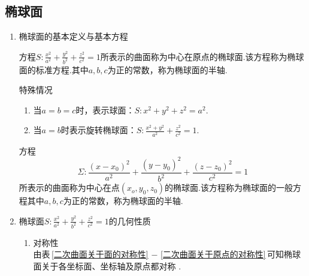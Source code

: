\subsection{椭球面}\label{椭球面}
\sja
\begin{enumerate}
	\setlength{\itemindent}{0em}
	\setlength{\topsep}{0.01em}
	\setlength{\itemsep}{0.01em}
	\item 椭球面的基本定义与基本方程
\jg

\enbelowdefination[椭球面]
\hspace*{1em} 方程$\displaystyle S:\frac{x^2}{a^2}+\frac{y^2}{b^2}+\frac{z^2}{c^2}=1$所表示的曲面称为中心在原点的{\color{dy}椭球面}.该方程称为{\color{dy}椭球面的标准方程}.其中$a,b,c$为正的常数，称为椭球面的{\color{dy}半轴}.
\par {\color{dy}特殊情况}
\sja
\begin{enumerate}
	\setlength{\itemindent}{1em}
	\setlength{\topsep}{0.01em}
	\setlength{\itemsep}{0.01em}
	\item 当$a=b=c$时，表示球面：$S:x^2+y^2+z^2=a^2$.
	\item 当$a=b$时表示{\color{dy}旋转椭球面}\label{旋转椭球面}：$ \displaystyle S:\frac{x^2+y^2}{a^2}+\frac{z^2}{c^2}=1$.
\end{enumerate}

\enbelowtheorem[椭球面的一般方程]
\hspace*{1em} 方程
\begin{equation}
\Sigma : \frac{(x-x_0)^2}{a^2}+\frac{(y-y_0)^2}{b^2}+\frac{(z-z_0)^2}{c^2}=1
\end{equation}
所表示的曲面称为中心在点$(x_o,y_0,z_0)$的{\color{dy}椭球面}.该方程称为{\color{dy}椭球面的一般方程}其中$a,b,c$为正的常数，称为椭球面的{\color{dy}半轴}.

\item 椭球面$\displaystyle S:\frac{x^2}{a^2}+\frac{y^2}{b^2}+\frac{z^2}{c^2}=1$的几何性质
\begin{enumerate}
	\setlength{\topsep}{0.01em}
	\setlength{\itemsep}{0.01em}
	\item 对称性\\
	\kg \kg 由表$\,$\ref{二次曲面关于面的对称性}  $-$ \ref{二次曲面关于原点的对称性}$\,$可知椭球面关于各坐标面、坐标轴及原点都对称 .
	

\end{enumerate}
\end{enumerate}
